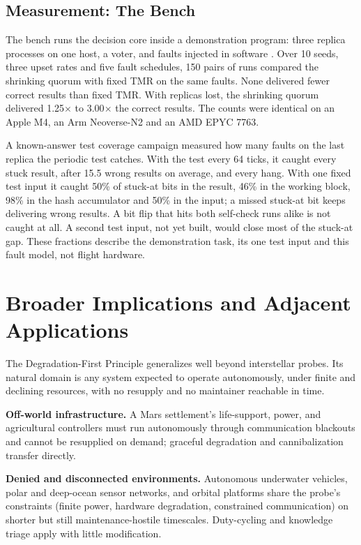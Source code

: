 \documentclass[10pt, a4paper]{article}
\begin{document}
\subsection{Measurement: The Bench}

The bench runs the decision core inside a demonstration program: three replica processes on one host, a voter, and faults injected in software \cite{flight2026}. Over 10 seeds, three upset rates and five fault schedules, 150 pairs of runs compared the shrinking quorum with fixed TMR on the same faults. None delivered fewer correct results than fixed TMR. With replicas lost, the shrinking quorum delivered 1.25$\times$ to 3.00$\times$ the correct results. The counts were identical on an Apple M4, an Arm Neoverse-N2 and an AMD EPYC 7763.

A known-answer test coverage campaign measured how many faults on the last replica the periodic test catches. With the test every 64 ticks, it caught every stuck result, after 15.5 wrong results on average, and every hang. With one fixed test input it caught 50\% of stuck-at bits in the result, 46\% in the working block, 98\% in the hash accumulator and 50\% in the input; a missed stuck-at bit keeps delivering wrong results. A bit flip that hits both self-check runs alike is not caught at all. A second test input, not yet built, would close most of the stuck-at gap. These fractions describe the demonstration task, its one test input and this fault model, not flight hardware.

\section{Broader Implications and Adjacent Applications}

The Degradation-First Principle generalizes well beyond interstellar probes. Its natural domain is any system expected to operate autonomously, under finite and declining resources, with no resupply and no maintainer reachable in time.

\textbf{Off-world infrastructure.} A Mars settlement's life-support, power, and agricultural controllers must run autonomously through communication blackouts and cannot be resupplied on demand; graceful degradation and cannibalization transfer directly.

\textbf{Denied and disconnected environments.} Autonomous underwater vehicles, polar and deep-ocean sensor networks, and orbital platforms share the probe's constraints (finite power, hardware degradation, constrained communication) on shorter but still maintenance-hostile timescales. Duty-cycling and knowledge triage apply with little modification.
\end{document}
